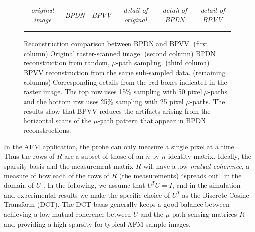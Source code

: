 \documentclass[journal]{IEEEtran}
\begin{document}
\noindent
\begingroup \setlength{\tabcolsep}{1pt}
\begin{figure}[ht!]
  \centering
  \begin{tabular}{cccccc}
    \textit{\small original image} & \textit{\small BPDN} & \textit{\small BPVV}
    & \textit{\small detail of original} & \textit{\small detail of BPDN} & \textit{\small detail of BPVV} \\
    
    & 
    & 
    & 
    & 
    &   \\
    
    & 
    & 
    & 
    & 
    & 
  \end{tabular}
  \caption{Reconstruction comparison between BPDN and BPVV. (first
    column) Original raster-scanned image. (second column) BPDN
    reconstruction from random, $\mu$-path sampling.
    (third column) BPVV reconstruction from the same
    sub-sampled data. (remaining columns) Corresponding details from
    the red boxes indicated in the raster image.
    The top row uses 15\% sampling with 50 pixel $\mu$-paths and the
    bottom row uses 25\% sampling with 25 pixel $\mu$-paths.
    The results show that BPVV reduces the artifacts arising from the
    horizontal scans of the $\mu$-path pattern that appear in BPDN
    reconstructions.}
  \label{fig:BPTV_demonstration}
\end{figure}
\endgroup
	
In the AFM application, the probe can only measure a single pixel at a
time. Thus the rows of $R$ are a subset of those of an $n$ by $n$
identity matrix. Ideally, the sparsity basis and the measurement
matrix $R$ will have a low \textit{mutual coherence}, a measure of how
each of the rows of $R$ (the measurements) ``spreads out'' in the
domain of $U$ \cite{candes2007sparsity}. In the following, we assume
that $U^TU=I$, and in the simulation and experimental results we make the specific choice of $U^T$ as the Discrete Cosine Transform (DCT). The DCT basis
generally keeps a good balance between achieving a low mutual
coherence between $U$ and the $\mu$-path sensing matrices $R$ and
providing a high sparsity for typical AFM sample images.
	
\end{document}
